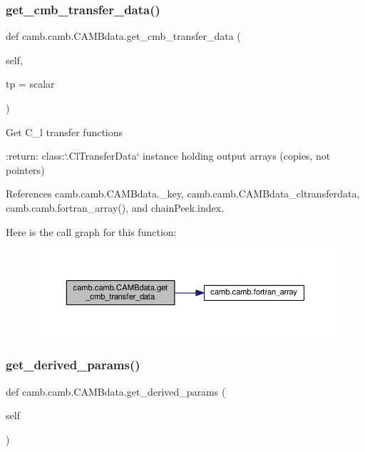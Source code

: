 \subsubsection{\texorpdfstring{get\+\_\+cmb\+\_\+transfer\+\_\+data()}{get\_cmb\_transfer\_data()}}
{\footnotesize\ttfamily def camb.\+camb.\+C\+A\+M\+Bdata.\+get\+\_\+cmb\+\_\+transfer\+\_\+data (\begin{DoxyParamCaption}\item[{}]{self,  }\item[{}]{tp = {\ttfamily \textquotesingle{}scalar\textquotesingle{}} }\end{DoxyParamCaption})}

\begin{DoxyVerb}Get C_l transfer functions

:return: class:`.ClTransferData` instance holding output arrays (copies, not pointers)
\end{DoxyVerb}
 

References camb.\+camb.\+C\+A\+M\+Bdata.\+\_\+key, camb.\+camb.\+C\+A\+M\+Bdata\+\_\+cltransferdata, camb.\+camb.\+fortran\+\_\+array(), and chain\+Peek.\+index.

Here is the call graph for this function\+:
\nopagebreak
\begin{figure}[H]
\begin{center}
\leavevmode
\includegraphics[width=350pt]{classcamb_1_1camb_1_1CAMBdata_a5065605556b12be1125fa51140eb745f_cgraph}
\end{center}
\end{figure}
\mbox{\label{classcamb_1_1camb_1_1CAMBdata_ac1f14ff98ff987cb382873be883e2552}} 
\subsubsection{\texorpdfstring{get\+\_\+derived\+\_\+params()}{get\_derived\_params()}}
{\footnotesize\ttfamily def camb.\+camb.\+C\+A\+M\+Bdata.\+get\+\_\+derived\+\_\+params (\begin{DoxyParamCaption}\item[{}]{self }\end{DoxyParamCaption})}


